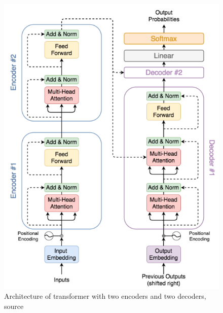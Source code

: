 \begin{figure}
    \centering
    \includegraphics[width=\linewidth]{images/two_layer_transformer.png}
    \caption{Architecture of transformer with two encoders and two decoders, source \cite{Yin2020}}
    \label{fig:nlp_transformer}
\end{figure}

